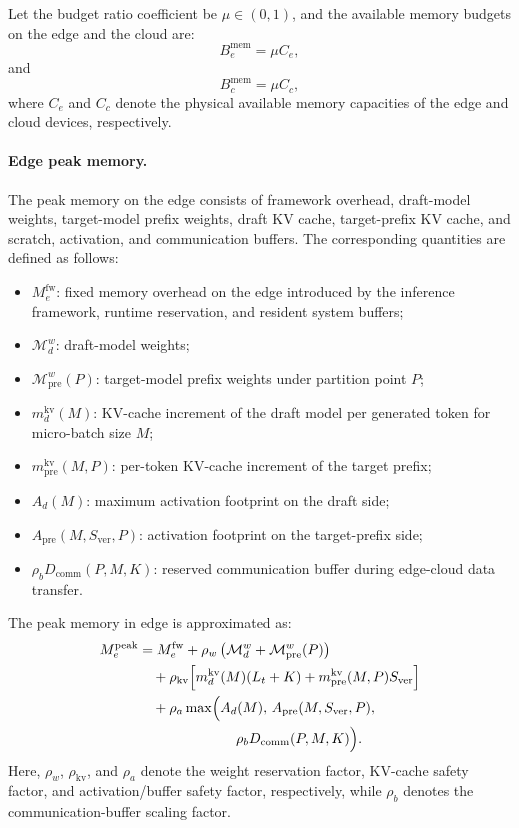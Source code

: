 \documentclass[a4paper,fleqn]{cas-dc}
\begin{document}
Let the budget ratio coefficient be $\mu \in (0,1)$, and the available memory budgets on the edge and the cloud are:
\begin{equation}
B_e^{\mathrm{mem}} = \mu C_e, 
\end{equation}
and
\begin{equation}
 B_c^{\mathrm{mem}} = \mu C_c,
\end{equation}
where $C_e$ and $C_c$ denote the physical available memory capacities of the edge and cloud devices, respectively.

\paragraph{Edge peak memory.}
The peak memory on the edge consists of framework overhead, draft-model weights, target-model prefix weights, draft KV cache, target-prefix KV cache, and scratch, activation, and communication buffers. The corresponding quantities are defined as follows:
\begin{itemize}
    \item $M_e^{\mathrm{fw}}$: fixed memory overhead on the edge introduced by the inference framework, runtime reservation, and resident system buffers;
    \item $\mathcal{M}_d^w$: draft-model weights;
    \item $\mathcal{M}_{\mathrm{pre}}^w(P)$: target-model prefix weights under partition point $P$;
    \item $m_d^{\mathrm{kv}}(M)$: KV-cache increment of the draft model per generated token for micro-batch size $M$;
    \item $m_{\mathrm{pre}}^{\mathrm{kv}}(M,P)$: per-token KV-cache increment of the target prefix;
    \item $A_d(M)$: maximum activation footprint on the draft side;
    \item $A_{\mathrm{pre}}(M,S_{\mathrm{ver}},P)$: activation footprint on the target-prefix side;
    \item $\rho_b D_{\mathrm{comm}}(P,M,K)$: reserved communication buffer during edge-cloud data transfer.
\end{itemize}

The peak memory in edge is approximated as:
\begin{equation}
\begin{aligned}
M_e^{\mathrm{peak}}
&= M_e^{\mathrm{fw}}
  + \rho_w \left(\mathcal{M}_d^w + \mathcal{M}_{\mathrm{pre}}^w(P)\right) \\
&\quad + \rho_{\mathrm{kv}} \Bigl[
    m_d^{\mathrm{kv}}(M)(L_t + K)
    + m_{\mathrm{pre}}^{\mathrm{kv}}(M,P) S_{\mathrm{ver}}
  \Bigr] \\
&\quad + \rho_a \max \Bigl(
    A_d(M),\,
    A_{\mathrm{pre}}(M,S_{\mathrm{ver}},P), \\
&\qquad\qquad\qquad\quad
    \rho_b D_{\mathrm{comm}}(P,M,K)
  \Bigr).
\end{aligned}
\end{equation}
Here, $\rho_w$, $\rho_{\mathrm{kv}}$, and $\rho_a$ denote the weight reservation factor, KV-cache safety factor, and activation/buffer safety factor, respectively, while $\rho_b$ denotes the communication-buffer scaling factor. 
\end{document}
